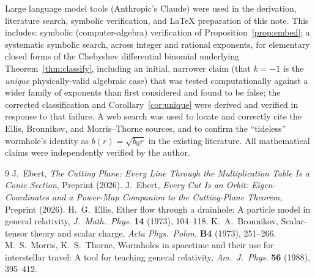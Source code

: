 \documentclass[12pt]{amsart}
\theoremstyle{plain}
\theoremstyle{remark}
\begin{document}
Large language model tools (Anthropic's Claude) were used in the derivation, literature search, symbolic verification, and \LaTeX{} preparation of this note. This includes: symbolic (computer-algebra) verification of Proposition~\ref{prop:embed}; a systematic symbolic search, across integer and rational exponents, for elementary closed forms of the Chebyshev differential binomial underlying Theorem~\ref{thm:classify}, including an initial, narrower claim (that $k=-1$ is the \emph{unique} physically-valid algebraic case) that was tested computationally against a wider family of exponents than first considered and found to be false; the corrected classification and Corollary~\ref{cor:unique} were derived and verified in response to that failure. A web search was used to locate and correctly cite the Ellis, Bronnikov, and Morris--Thorne sources, and to confirm the ``tideless'' wormhole's identity as $b(r)=\sqrt{b_0r}$ in the existing literature. All mathematical claims were independently verified by the author.

\begin{thebibliography}{9}
 J.~Ebert, \emph{The Cutting Plane: Every Line Through the Multiplication Table Is a Conic Section}, Preprint (2026).
 J.~Ebert, \emph{Every Cut Is an Orbit: Eigen-Coordinates and a Power-Map Companion to the Cutting-Plane Theorem}, Preprint (2026).
 H.~G.~Ellis, Ether flow through a drainhole: A particle model in general relativity, \emph{J.\ Math.\ Phys.} \textbf{14} (1973), 104--118.
 K.~A.~Bronnikov, Scalar-tensor theory and scalar charge, \emph{Acta Phys.\ Polon.} \textbf{B4} (1973), 251--266.
 M.~S.~Morris, K.~S.~Thorne, Wormholes in spacetime and their use for interstellar travel: A tool for teaching general relativity, \emph{Am.\ J.\ Phys.} \textbf{56} (1988), 395--412.
\end{thebibliography}
\end{document}
